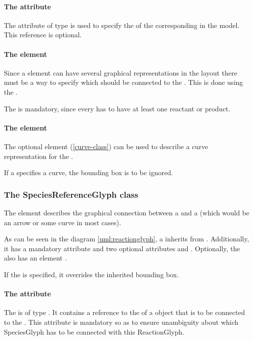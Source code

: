 \paragraph{The  attribute}
The  attribute of type  is used to 
specify the  of the corresponding \Reaction in the model. This 
reference is optional. 


\paragraph {The  element}
\label{listofspeciesreferenceglyphs-class}
Since a \Species element can have several graphical representations in 
the layout there must be a way to specify which \SpeciesGlyph should be 
connected to the \ReactionGlyph. This is done using the 
. 

The \ListOfSpeciesReferenceGlyphs is mandatory, since every \Reaction 
has to have at least one reactant or product. 


\paragraph {The  element}
The optional \Curve element (\ref{curve-class}) can be used to describe 
a curve representation for the \ReactionGlyph. 

If a \ReactionGlyph specifies a curve, the bounding box is to be 
ignored. 


\subsubsection{The SpeciesReferenceGlyph class}
\label{speciesreferenceglyph-class}
The  element describes the graphical 
connection between a \SpeciesGlyph and a \ReactionGlyph (which would be 
an arrow or some curve in most cases). 

As can be seen in the diagram \ref{uml:reactionglyph}, a 
\SpeciesReferenceGlyph inherits from \GraphicalObject. Additionally, it 
has a mandatory attribute  and two optional 
attributes  and . Optionally, the 
\SpeciesReferenceGlyph also has an element . 

If the  is specified, it overrides the inherited bounding box.


\paragraph{The  attribute}
The  is of type . It contains a 
reference to the  of a \SpeciesGlyph object that is to be 
connected to the \ReactionGlyph. 
 This attribute is mandatory so as to ensure unambiguity about which 
SpeciesGlyph has to be connected with this ReactionGlyph. 



